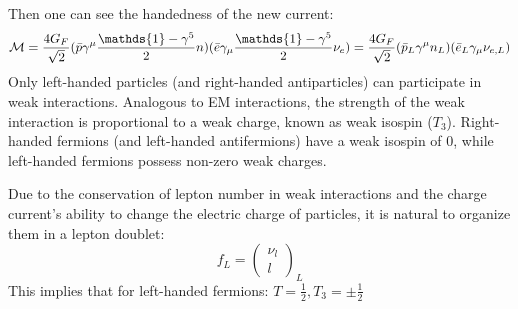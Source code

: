 Then one can see the handedness of the new current:
\begin{equation}
    \CM = \frac{4G_F}{\sqrt{2}}(\bar{p} \gamma^\mu\frac{\mathds{1} - \gamma^5}{2} n) (\bar{e} \gamma_\mu\frac{\mathds{1} - \gamma^5}{2} \nu_e) 
    = \frac{4G_F}{\sqrt{2}}(\bar{p}_L \gamma^\mu n_L)(\bar{e}_L \gamma_\mu \nu_{e,L})
\end{equation}
Only left-handed particles (and right-handed antiparticles) can participate in 
weak interactions. Analogous to EM interactions, the strength of the weak 
interaction is proportional to a weak charge, known as weak isospin ($T_3$). 
Right-handed fermions (and left-handed antifermions) 
have a weak isospin of 0, while left-handed fermions possess non-zero weak charges.

Due to the conservation of lepton number in weak interactions and the charge current's
ability to change the electric charge of particles, it is natural to organize 
them in a lepton doublet:
\begin{equation}
    f_L = \begin{pmatrix} \nu_l \\ l \end{pmatrix}_L
\end{equation}
This implies that for left-handed fermions: $T=\frac{1}{2}, T_3 = \pm\frac{1}{2}$ 

